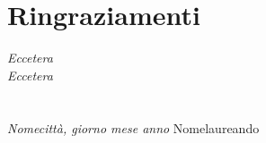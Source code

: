 \newpage

{}
\chapter*{Ringraziamenti\label{sec:ringraziamenti}}

\noindent\textit{Eccetera}\\

\noindent\textit{Eccetera}\\\\\\

\textit{Nomecittà, giorno mese anno}
\hfill Nomelaureando